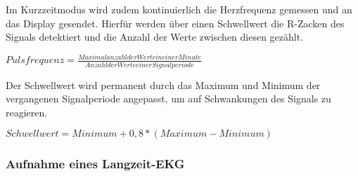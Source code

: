 Im Kurzzeitmodus wird zudem kontinuierlich die Herzfrequenz gemessen und an das Display gesendet. Hierfür werden über einen Schwellwert die R-Zacken des Signals detektiert und die Anzahl der Werte zwischen diesen gezählt. 

$ Pulsfrequenz = \frac{Maximalanzahl der Werte in einer Minute}{Anzahl der Werte einer Signalperiode} $

Der Schwellwert wird permanent durch das Maximum und Minimum der vergangenen Signalperiode angepasst, um auf Schwankungen des Signals zu reagieren.

$ Schwellwert = Minimum + 0,8 * (Maximum - Minimum) $

\subsubsection{Aufnahme eines Langzeit-EKG}

